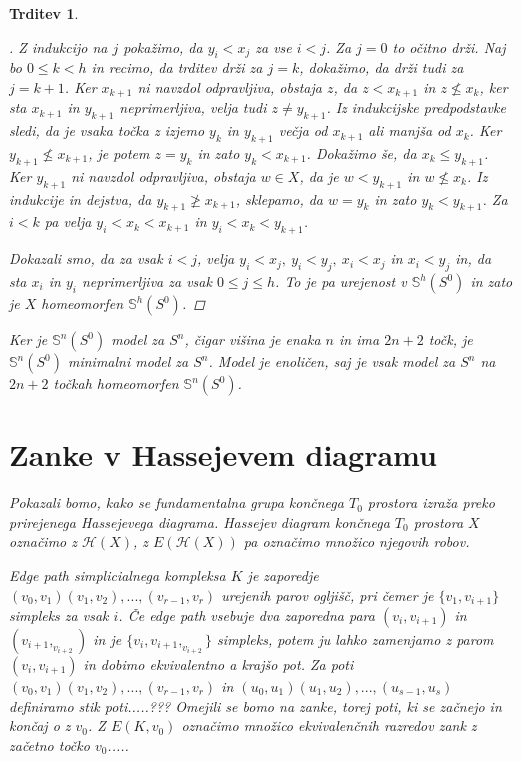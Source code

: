 \documentclass[a4paper,12pt]{article}
\DeclareRobustCommand{\h}{
    \mathcal{H}
}
\theoremstyle{definition}
\theoremstyle{plain}
\newtheorem{izrek}{Izrek}
\theoremstyle{definition}
\theoremstyle{plain}
\newtheorem{trditev}{Trditev}
\theoremstyle{plain}
\theoremstyle{plain}
\theoremstyle{plain}
\newenvironment{dokaz}{\begin{proof}[\bfseries\upshape\proofname]}{\end{proof}}
\begin{document}
\begin{trditev}
\begin{dokaz}
        Z indukcijo na $j$ pokažimo, da $y_i < x_j$ za vse $i<j$. Za $j=0$ to 
        očitno drži. Naj bo $0\leq k <h$ in recimo, da trditev drži za $j=k$, 
        dokažimo, da drži tudi za $j=k+1$. Ker $x_{k+1}$ ni navzdol odpravljiva, 
        obstaja $z$, da $z< x_{k+1}$ in $z\nleq x_k$, ker sta $x_{k+1}$ in 
        $y_{k+1}$ neprimerljiva, velja tudi $z\neq y_{k+1}$. Iz indukcijske 
        predpodstavke sledi, da je vsaka točka z izjemo $y_k$ in $y_{k+1}$ večja 
        od $x_{k+1}$ ali manjša od $x_k$. Ker $y_{k+1} \nleq x_{k+1}$, je potem
        $z=y_k$ in zato $y_k<x_{k+1}$. Dokažimo še, da $x_k\leq y_{k+1}$. Ker 
        $y_{k+1}$ ni navzdol odpravljiva, obstaja $w\in X$, da je $w<y_{k+1}$ in 
        $w\nleq x_k$. Iz indukcije in dejstva, da $y_{k+1}\ngeq x_{k+1}$, sklepamo,
        da $w=y_k$ in zato $y_k<y_{k+1}$. Za $i<k$ pa velja $y_i<x_k<x_{k+1}$ in
        $y_i<x_k<y_{k+1}$.

        Dokazali smo, da za vsak $i<j$,  velja $y_i < x_j,\ y_i < y_j,\ x_i < x_j$ in
        $x_i < y_j$ in, da sta $x_i$ in $y_i$ neprimerljiva za vsak $0\leq j \leq h$.
        To je pa urejenost v $\mathds{S}^h(S^0)$ in zato je $X$ homeomorfen 
        $\mathds{S}^h(S^0)$.

\end{dokaz}



Ker je $\mathds{S}^n(S^0)$ model za $S^n$, čigar višina je enaka $n$ in ima 
$2n+2$ točk, je $\mathds{S}^n(S^0)$ minimalni model za $S^n$. Model je 
enoličen, saj je vsak model za $S^n$ na $2n+2$ točkah homeomorfen 
$\mathds{S}^n(S^0)$.


\section{Zanke v Hassejevem diagramu}

Pokazali bomo, kako se fundamentalna grupa končnega $T_0$ 
prostora izraža preko prirejenega Hassejevega diagrama.
Hassejev diagram končnega $T_0$ prostora $X$ označimo z 
$\h(X)$, z $E(\h(X))$ pa označimo množico njegovih robov.

\textit{Edge path} simplicialnega kompleksa $K$ je zaporedje
$(v_0,v_1)(v_1,v_2),...,(v_{r-1},v_{r})$ urejenih parov 
ogljišč, pri čemer je $\{v_1,v_{i+1}\}$ simpleks za vsak $i$. 
Če \textit{edge path} vsebuje dva zaporedna para 
$(v_i,v_{i+1})$ in $(v_{i+1},_v_{i+2})$ in je 
$\{v_i,v_{i+1},_v_{i+2}\}$ simpleks, potem ju lahko 
zamenjamo z parom $(v_i,v_{i+1})$ in dobimo ekvivalentno a 
krajšo pot. Za poti $(v_0,v_1)(v_1,v_2),...,(v_{r-1},v_{r})$ 
in $(u_0,u_1)(u_1,u_2),...,(u_{s-1},u_{s})$ definiramo stik 
poti.....???
Omejili se bomo na zanke, torej poti, ki se začnejo in končaj
o z $v_0$. Z $E(K,v_0)$ označimo množico ekvivalenčnih razredov
 zank z začetno točko $v_0$.....



\end{trditev}
\end{document}
